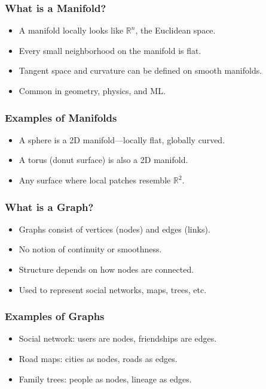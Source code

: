 \begin{frame}[fragile]\frametitle{What is a Manifold?}
    \begin{itemize}
        \item A manifold locally looks like \(\mathbb{R}^n\), the Euclidean space.
        \item Every small neighborhood on the manifold is flat.
        \item Tangent space and curvature can be defined on smooth manifolds.
        \item Common in geometry, physics, and ML.
    \end{itemize}
\end{frame}

\begin{frame}[fragile]\frametitle{Examples of Manifolds}
    \begin{itemize}
        \item A sphere is a 2D manifold—locally flat, globally curved.
        \item A torus (donut surface) is also a 2D manifold.
        \item Any surface where local patches resemble \(\mathbb{R}^2\).
    \end{itemize}
\end{frame}

\begin{frame}[fragile]\frametitle{What is a Graph?}
    \begin{itemize}
        \item Graphs consist of vertices (nodes) and edges (links).
        \item No notion of continuity or smoothness.
        \item Structure depends on how nodes are connected.
        \item Used to represent social networks, maps, trees, etc.
    \end{itemize}
\end{frame}

\begin{frame}[fragile]\frametitle{Examples of Graphs}
    \begin{itemize}
        \item Social network: users are nodes, friendships are edges.
        \item Road maps: cities as nodes, roads as edges.
        \item Family trees: people as nodes, lineage as edges.
    \end{itemize}
\end{frame}


